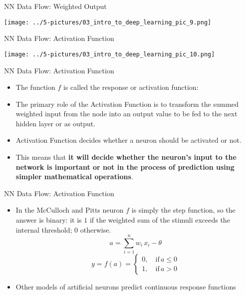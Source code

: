 \documentclass[11pt]{beamer}
\begin{document}
\begin{frame}{NN Data Flow: Weighted Output}
	\begin{center}
	\texttt{[image: ../5-pictures/03\_intro\_to\_deep\_learning\_pic\_9.png]}
	\end{center}
\end{frame}
\begin{frame}{NN Data Flow: Activation Function}
	\begin{center}
	\texttt{[image: ../5-pictures/03\_intro\_to\_deep\_learning\_pic\_10.png]}
	\end{center}
\end{frame}
\begin{frame}{NN Data Flow: Activation Function}
	\begin{itemize}
		\item The function $f$ is called the response or activation function:
		\item The primary role of the Activation Function is to transform the summed weighted input from the node into an output value to be fed to the next hidden layer or as output. 
		\item Activation Function decides whether a neuron should be activated or not. 
		\item This means that \textbf{it will decide whether the neuron’s input to the network is important or not in the process of prediction using simpler mathematical operations}. 
	\end{itemize}
\end{frame}
\begin{frame}{NN Data Flow: Activation Function}
	\begin{itemize}
		\item In the McCulloch and Pitts neuron $f$ is simply the step function, so the answer is binary: it is $1$ if the weighted sum of the stimuli exceeds the internal threshold; $0$ otherwise.
\begin{equation} a = \sum\limits_{i=1}^n w_i \, x_i - \theta \end{equation}
\begin{equation} y = f(a) = \begin{cases} 0, \quad \text{if} \, a \le 0 \\ 1, \quad \text{if} \, a > 0\end{cases} \end{equation}
		\item Other models of artificial neurons predict continuous response functions
	\end{itemize}
\end{frame}
\end{document}
